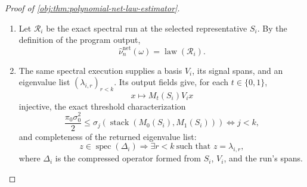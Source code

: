 \begin{proof}[Proof of \cref{obj:thm:polynomial-net-law-estimator}]
\begin{enumerate}
\item Let \(\mathcal R_i\) be the exact spectral run at the selected
representative \(S_i\).  By the definition of the program output,
\begin{equation}
\widehat\nu_n^{\mathrm{net}}(\omega)=\operatorname{law}(\mathcal R_i).
\label{eq:finite-net-selected-run-law}
\end{equation} %

\item The same spectral execution supplies a basis \(V_i\), its signal spans,
and an eigenvalue list \((\lambda_{i,r})_{r<k}\).  Its output fields give, for
each \(t\in\{0,1\}\),
\[
x\longmapsto M_t(S_i)V_i x
\]
injective, the exact threshold characterization
\[
\frac{\pi_0\sigma_0^2}{2}
\le
\sigma_j\!\left(\operatorname{stack}(M_0(S_i),M_1(S_i))\right)
\Longleftrightarrow j<k,
\]
and completeness of the returned eigenvalue list:
\[
z\in\operatorname{spec}(\Delta_i)
\Longrightarrow
\exists r<k\ \text{such that }z=\lambda_{i,r},
\]
where \(\Delta_i\) is the compressed operator formed from \(S_i\), \(V_i\), and
the run's spans. %


\end{enumerate}
\end{proof}
